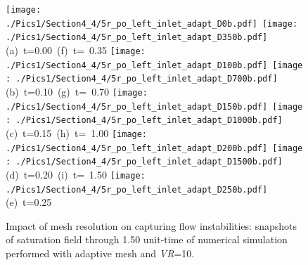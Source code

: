  \begin{figure}[ht]
  \vbox{\vspace{-2.cm}
      \hbox{\texttt{[image: ./Pics1/Section4\_4/5r\_po\_left\_inlet\_adapt\_D0b.pdf]} 
            \texttt{[image: ./Pics1/Section4\_4/5r\_po\_left\_inlet\_adapt\_D350b.pdf]}}
      \vspace{-.1cm}\hbox{\hspace{2.cm}(a) t=0.00 \hspace{4cm} (f) t= 0.35}\vspace{-.1cm}
      \hbox{\texttt{[image: ./Pics1/Section4\_4/5r\_po\_left\_inlet\_adapt\_D100b.pdf]} 
            \texttt{[image: ./Pics1/Section4\_4/5r\_po\_left\_inlet\_adapt\_D700b.pdf]}}
      \vspace{-.1cm}\hbox{\hspace{2.cm}(b) t=0.10 \hspace{4cm} (g) t= 0.70}\vspace{-.1cm}
      \hbox{\texttt{[image: ./Pics1/Section4\_4/5r\_po\_left\_inlet\_adapt\_D150b.pdf]} 
            \texttt{[image: ./Pics1/Section4\_4/5r\_po\_left\_inlet\_adapt\_D1000b.pdf]}}
      \vspace{-.1cm}\hbox{\hspace{2.cm}(c) t=0.15 \hspace{4cm} (h) t= 1.00}\vspace{-.1cm}
      \hbox{\texttt{[image: ./Pics1/Section4\_4/5r\_po\_left\_inlet\_adapt\_D200b.pdf]} 
            \texttt{[image: ./Pics1/Section4\_4/5r\_po\_left\_inlet\_adapt\_D1500b.pdf]}}
      \vspace{-.1cm}\hbox{\hspace{2.cm}(d) t=0.20 \hspace{4cm} (i) t= 1.50}\vspace{-.1cm}
      \hbox{\texttt{[image: ./Pics1/Section4\_4/5r\_po\_left\_inlet\_adapt\_D250b.pdf]}}
      \vspace{-.1cm}\hbox{\hspace{2.cm}(e) t=0.25}\vspace{-.1cm}}
\caption{Impact of mesh resolution on capturing flow instabilities: snapshots of saturation field through 1.50 unit-time of numerical simulation performed with adaptive mesh and {\it VR}=10.}
\label{fig:5regions_adaptmesh}
\end{figure}
\clearpage



